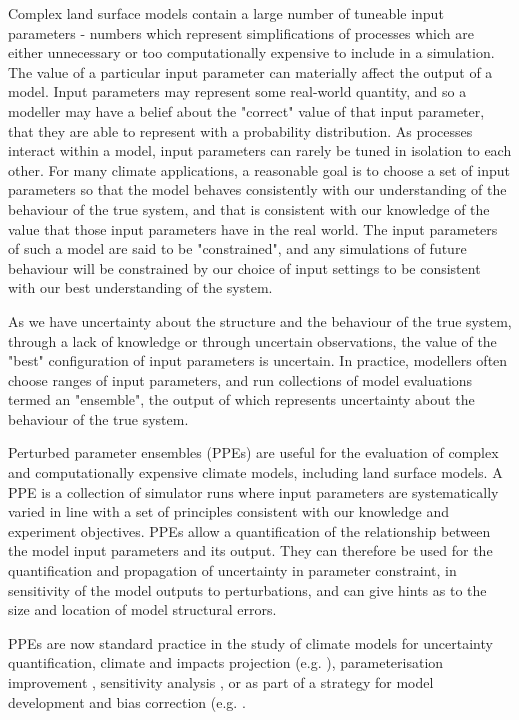 \documentclass[gmd, manuscript]{copernicus}
\begin{document}
Complex land surface models contain a large number of tuneable input parameters - numbers which represent simplifications of processes which are either unnecessary or too computationally expensive to include in a simulation. The value of a particular input parameter can materially affect the output of a model. Input parameters may represent some real-world quantity, and so a modeller may have a belief about the "correct" value of that input parameter, that they are able to represent with a probability distribution. As processes interact within a model, input parameters can rarely be tuned in isolation to each other. For many climate applications, a reasonable goal is to choose a set of input parameters so that the model behaves consistently with our understanding of the behaviour of the true system, and that is consistent with our knowledge of the value that those input parameters have in the real world. The input parameters of such a model are said to be "constrained", and any simulations of future behaviour will be constrained by our choice of input settings to be consistent with our best understanding of the system.

As we have uncertainty about the structure and the behaviour of the true system, through a lack of knowledge or through uncertain observations, the value of the "best" configuration of input parameters is uncertain. In practice, modellers often choose ranges of input parameters, and run collections of model evaluations termed an "ensemble", the output of which represents uncertainty about the behaviour of the true system.

Perturbed parameter ensembles (PPEs) are useful for the evaluation of complex and computationally expensive climate models, including land surface models. A PPE is a collection of simulator runs where input parameters are systematically varied in line with a set of principles consistent with our knowledge and experiment objectives. PPEs allow a quantification of the relationship between the model input parameters and its output. They can therefore be used for the quantification and propagation of uncertainty in parameter constraint, in sensitivity of the model outputs to perturbations, and can give hints as to the size and location of model structural errors.

PPEs are now standard practice in the study of climate models for uncertainty quantification, climate and impacts projection (e.g. \cite{sexton2021perturbed, edwards2019revisiting}), parameterisation improvement \citep{couvreux2021process}, sensitivity analysis \citep{carslaw2013large}, or as part of a strategy for model development and bias correction (e.g. \cite{williamson2015identifying,mcneall2016impact, mcneall2020correcting, hourdin2017art}.
\end{document}
